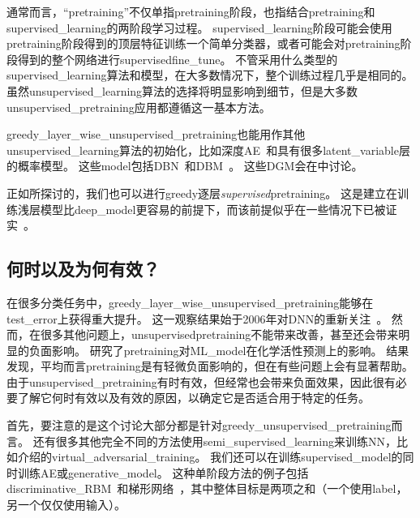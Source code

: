 
通常而言，``\gls{pretraining}''不仅单指\gls{pretraining}阶段，也指结合\gls{pretraining}和\gls{supervised_learning}的两阶段学习过程。
\gls{supervised_learning}阶段可能会使用\gls{pretraining}阶段得到的顶层特征训练一个简单分类器，或者可能会对\gls{pretraining}阶段得到的整个网络进行\gls{supervised}\gls{fine_tune}。
不管采用什么类型的\gls{supervised_learning}算法和模型，在大多数情况下，整个训练过程几乎是相同的。
虽然\gls{unsupervised_learning}算法的选择将明显影响到细节，但是大多数\gls{unsupervised_pretraining}应用都遵循这一基本方法。


\gls{greedy_layer_wise_unsupervised_pretraining}也能用作其他\gls{unsupervised_learning}算法的初始化，比如深度\gls{AE}~\citep{Hinton-Science2006}和具有很多\gls{latent_variable}层的概率模型。
这些\gls{model}包括\gls{DBN}~\citep{Hinton06-small}和\gls{DBM}~\citep{SalHinton09}。
这些\gls{DGM}会在中讨论。


正如所探讨的，我们也可以进行\gls{greedy}逐层\emph{\gls{supervised}}\gls{pretraining}。
这是建立在训练浅层模型比\gls{deep_model}更容易的前提下，而该前提似乎在一些情况下已被证实~\citep{Erhan+al-2010-small}。


\subsection{何时以及为何有效？}
\label{sec:when_and_why_does_unsupervised_pretraining_work}


在很多分类任务中，\gls{greedy_layer_wise_unsupervised_pretraining}能够在\gls{test_error}上获得重大提升。
这一观察结果始于2006年对\gls{DNN}的重新关注~\citep{Hinton06-small,Bengio-nips-2006,ranzato-07-small}。
然而，在很多其他问题上，\gls{unsupervised}\gls{pretraining}不能带来改善，甚至还会带来明显的负面影响。
\cite{Ma-et-al-2015}研究了\gls{pretraining}对\gls{ML_model}在化学活性预测上的影响。
结果发现，平均而言\gls{pretraining}是有轻微负面影响的，但在有些问题上会有显著帮助。
由于\gls{unsupervised_pretraining}有时有效，但经常也会带来负面效果，因此很有必要了解它何时有效以及有效的原因，以确定它是否适合用于特定的任务。



首先，要注意的是这个讨论大部分都是针对\gls{greedy_unsupervised_pretraining}而言。
还有很多其他完全不同的方法使用\gls{semi_supervised_learning}来训练\gls{NN}，比如介绍的\gls{virtual_adversarial_training}。
我们还可以在训练\gls{supervised_model}的同时训练\gls{AE}或\gls{generative_model}。
这种单阶段方法的例子包括\gls{discriminative_RBM}~\citep{Larochelle+Bengio-2008}和梯形网络~\citep{Rasmus-et-al-arxiv2015}，其中整体目标是两项之和（一个使用\gls{label}，另一个仅仅使用输入）。

